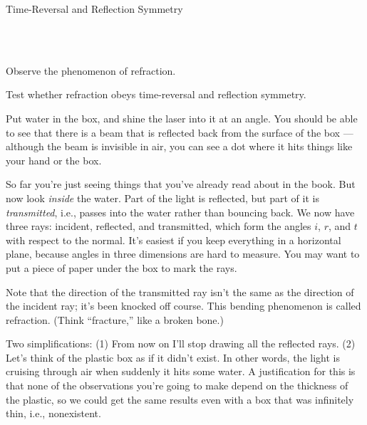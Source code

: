
\begin{lab}{Time-Reversal and Reflection Sym\-met\-ry}

\apparatus
{}\\
\\

\begin{goals}

\item[] Observe the phenomenon of refraction.

\item[] Test whether refraction obeys time-reversal and reflection symmetry.

\end{goals}


Put water in the box, and shine the laser into it at an angle. You should be able
to see that there is a beam that is reflected back from the surface of the box --- although the beam
is invisible in air, you can see a dot where it hits things like your hand or the box.

So far you're just seeing things that you've already read about in the book. But now
look \emph{inside} the water. Part of the light is reflected, but part of it is
\emph{transmitted}, i.e., passes into the water rather than bouncing back. 
We now have three rays: incident, reflected, and transmitted, which form the
angles $i$, $r$, and $t$ with respect to the normal.
It's easiest if you keep everything in a horizontal plane, because angles in three dimensions are
hard to measure. You may want to put a piece of paper under the box to mark the rays.


Note that the direction of the transmitted ray isn't the same as the direction of the
incident ray; it's been knocked off course. This bending phenomenon is called refraction.
(Think ``fracture,'' like a broken bone.) 

Two simplifications: (1) From now on I'll stop drawing all the reflected rays.
(2) Let's think of the plastic box as if it didn't exist. In other words, the
light is cruising through air when suddenly it hits some water. A justification for this is that
none of the observations you're going to make depend on the thickness of the plastic, so we could
get the same results even with a box that was infinitely thin, i.e., nonexistent. 


\end{lab}
